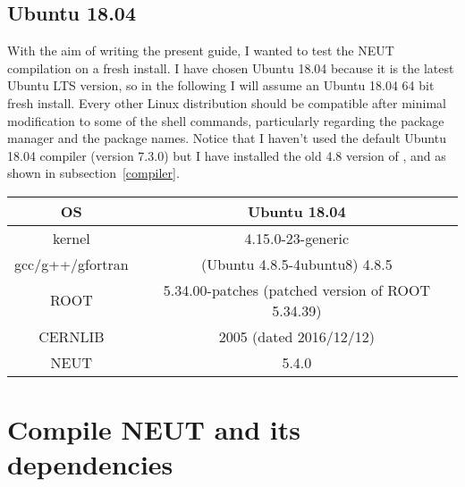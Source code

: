 \subsection{Ubuntu 18.04}
With the aim of writing the present guide, I wanted to test
the NEUT compilation on a fresh install. I have chosen Ubuntu 18.04
because it is the latest Ubuntu LTS version, so in the following I
will assume an Ubuntu 18.04 64 bit fresh install.  Every other Linux
distribution should be compatible after minimal modification to some
of the shell commands, particularly regarding the package manager and
the package names. Notice that I haven't used the default Ubuntu 18.04
compiler (version 7.3.0) but I have installed the old 4.8 version of
,  and  as shown
in subsection~\ref{compiler}. 
\begin{center}
  \begin{tabular}{||c | c||} %
    \hline %
    OS & Ubuntu 18.04 \\ [0.5ex] 
    \hline\hline %
    kernel & 4.15.0-23-generic \\ 
    \hline %
    gcc/g++/gfortran & (Ubuntu 4.8.5-4ubuntu8) 4.8.5 \\
    \hline %
    ROOT & 5.34.00-patches (patched version of ROOT 5.34.39) \\
    \hline %
    CERNLIB & 2005 (dated 2016/12/12) \\
    \hline %
    NEUT & 5.4.0 \\ [1ex] 
    \hline
  \end{tabular}
\end{center}

\section{Compile NEUT and its dependencies}
